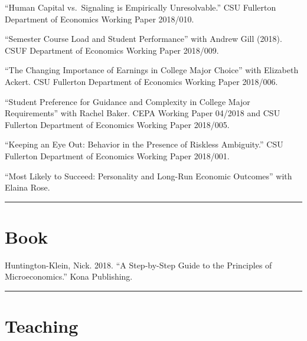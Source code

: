 \documentclass[11pt,a4paper]{article}
\begin{document}
\begin{hangparas}{.25in}{1}

``Human Capital vs.~Signaling is Empirically Unresolvable.'' CSU Fullerton Department of Economics Working Paper 2018/010.



``Semester Course Load and Student Performance'' with Andrew Gill (2018). CSUF Department of Economics Working Paper 2018/009.



``The Changing Importance of Earnings in College Major Choice'' with Elizabeth Ackert. CSU Fullerton Department of Economics Working Paper 2018/006.



``Student Preference for Guidance and Complexity in College Major Requirements'' with Rachel Baker. CEPA Working Paper 04/2018 and CSU Fullerton Department of Economics Working Paper 2018/005.



``Keeping an Eye Out: Behavior in the Presence of Riskless Ambiguity.'' CSU Fullerton Department of Economics Working Paper 2018/001.



``Most Likely to Succeed: Personality and Long-Run Economic Outcomes'' with Elaina Rose.

 

\end{hangparas}

\vspace{1cm} \hrule \vspace{1cm}





\section*{Book} 



Huntington-Klein, Nick. 2018. ``A Step-by-Step Guide to the Principles of Microeconomics.'' Kona Publishing.



\vspace{1cm} \hrule \vspace{1cm}





\section*{Teaching} 
\end{document}

